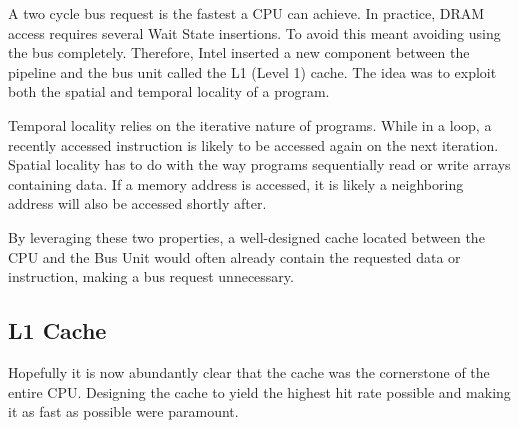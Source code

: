 \par
A two cycle bus request is the fastest a CPU can achieve. In practice, DRAM access requires several Wait State insertions.
To avoid this meant avoiding using the bus completely. Therefore, Intel inserted a new component between the pipeline and the bus unit called the L1 (Level 1) cache. The idea was to exploit both the spatial and temporal locality of a program.\\
\par
Temporal locality relies on the iterative nature of programs. While in a loop, a recently accessed instruction is likely to be accessed again on the next iteration. Spatial locality has to do with the way programs sequentially read or write arrays containing data. If a memory address is accessed, it is likely a neighboring address will also be accessed shortly after.\\
\par
By leveraging these two properties, a well-designed cache located between the CPU and the Bus Unit would often already contain the requested data or instruction, making a bus request unnecessary.\\
\par
{}



\vspace{-20pt}
\subsection{L1 Cache}
Hopefully it is now abundantly clear that the cache was the cornerstone of the entire CPU. Designing the cache to yield the highest hit rate possible and making it as fast as possible were paramount. 

